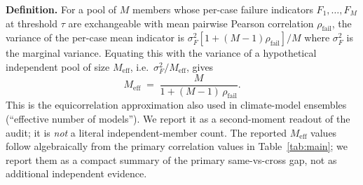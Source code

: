\textbf{Definition.} For a pool of $M$ members whose per-case failure indicators
$F_1,\dots,F_M$ at threshold $\tau$ are exchangeable with mean pairwise Pearson
correlation $\rho_{\mathrm{fail}}$, the variance of the per-case mean indicator is
$\sigma^2_F [1 + (M-1)\rho_{\mathrm{fail}}] / M$ where $\sigma^2_F$ is the marginal
variance. Equating this with the variance of a hypothetical independent pool of
size $M_{\mathrm{eff}}$, i.e.\ $\sigma^2_F / M_{\mathrm{eff}}$, gives
\[
  M_{\mathrm{eff}} \;=\; \frac{M}{1 + (M-1)\,\rho_{\mathrm{fail}}}.
\]
This is the equicorrelation approximation also used in climate-model ensembles
(``effective number of models''). We report it as a second-moment readout of
the audit; it is \emph{not} a literal independent-member count. The reported $M_{\mathrm{eff}}$ values follow algebraically from the primary correlation values in Table~\ref{tab:main}; we report them as a compact summary of the primary same-vs-cross gap, not as additional independent evidence.

